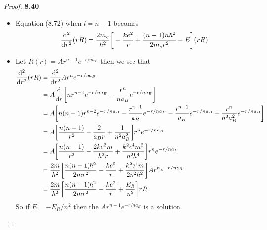 \documentclass[11pt]{article}
\theoremstyle{definition}
\begin{document}
\cleardoublepage
\begin{proof}{\textbf{8.40}}
\begin{itemize}
\item[\textbf{(a)}] Equation (8.72) when $l = n-1$ becomes
\begin{align*}
    \dv[2]{r}(rR) = \frac{2m_e}{\hbar^2}\bigg[
    -\frac{ke^2}{r} + \frac{(n-1)n\hbar^2}{2m_e r^2} - E\bigg](rR)
\end{align*}
\item[\textbf{(b)}] Let $R(r) = Ar^{n-1}e^{-r/na_B}$ then we see that
\begin{align*}
    \dv[2]{r}(rR) &= \dv[2]{r}Ar^{n}e^{-r/na_B}\\
    &= A\dv{r}\bigg[nr^{n-1}e^{-r/na_B} - \frac{r^n}{na_B}e^{-r/na_B}\bigg]\\
    &= A\bigg[n(n - 1)r^{n-2}e^{-r/na_B} - \frac{r^{n-1}}{a_B}e^{-r/na_B}
    - \frac{r^{n-1}}{a_B}e^{-r/na_B} + \frac{r^{n}}{n^2a_B^2}e^{-r/na_B}\bigg]\\
    &= A\bigg[\frac{n(n - 1)}{r^{2}} - \frac{2}{a_B r}
    + \frac{1}{n^2a_B^2}\bigg]r^ne^{-r/na_B}\\
    &= A\bigg[\frac{n(n - 1)}{r^{2}} - \frac{2ke^2m}{\hbar^2 r}
    + \frac{k^2e^4m^2}{n^2\hbar^4}\bigg]r^ne^{-r/na_B}\\
    &= \frac{2m}{\hbar^2}\bigg[
    \frac{n(n - 1)\hbar^2}{2mr^{2}} - \frac{ke^2}{r}
    + \frac{k^2e^4m}{2n^2\hbar^2}\bigg]Ar^ne^{-r/na_B}\\
    &= \frac{2m}{\hbar^2}\bigg[
    \frac{n(n - 1)\hbar^2}{2mr^{2}} - \frac{ke^2}{r}
    + \frac{E_R}{n^2} \bigg]rR
\end{align*}
So if $E = -E_R/n^2$ then the $Ar^{n-1}e^{-r/na_B}$ is a solution.
\end{itemize}
\end{proof}
\end{document}
